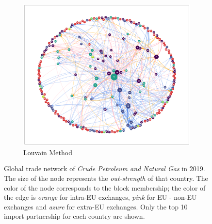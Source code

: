\begin{figure}
    \begin{subfigure}{0.5\textheight}
        \centering
        \includegraphics[width=\textwidth]{pics/full_y19_p06_force_147_lou.png}
        \caption{Louvain Method}
        \label{fig:gasnetworklou}
    \end{subfigure}
    \caption[Global trade network of \textit{Crude Petroleum and Natural Gas} in 2019, with communities.]{Global trade network of \textit{Crude Petroleum and Natural Gas} in 2019. The size of the node represents the \textit{out-strength} of that country. The color of the node corresponds to the block membership; the color of the edge is \textit{orange} for intra-EU exchanges, \textit{pink} for EU - non-EU exchanges and \textit{azure} for extra-EU exchanges. Only the top 10 import partnership for each country are shown.}
    \label{fig:gascommunities}
\end{figure}

